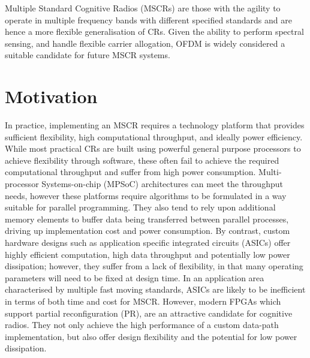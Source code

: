 Multiple Standard Cognitive Radios (MSCRs) are those with the agility to operate in multiple frequency bands with different specified standards and are hence a more flexible generalisation of CRs. %
Given the ability to perform spectral sensing, and handle flexible carrier allogation, OFDM is widely considered a suitable candidate for future MSCR systems.

\section{Motivation}

In practice, implementing an MSCR requires a technology platform that provides sufficient flexibility, high computational throughput, and ideally power efficiency.
While most practical CRs are built using powerful general purpose processors to achieve flexibility through software, these often fail to achieve the required computational throughput and suffer from high power consumption.
Multi-processor Systems-on-chip (MPSoC) architectures can meet the throughput needs, however these platforms require algorithms to be formulated in a way suitable for parallel programming.
They also tend to rely upon additional memory elements to buffer data being transferred between parallel processes, driving up implementation cost and power consumption.
By contrast, custom hardware designs such as application specific integrated circuits (ASICs) offer highly efficient computation, high data throughput and potentially low power dissipation; however, they suffer from a lack of flexibility, in that many operating parameters will need to be fixed at design time.
In an application area characterised by multiple fast moving standards, ASICs are likely to be inefficient in terms of both time and cost for MSCR.
However, modern FPGAs which support partial reconfiguration (PR), are an attractive candidate for cognitive radios.
They not only achieve the high performance of a custom data-path implementation, but also offer design flexibility and the potential for low power dissipation.

